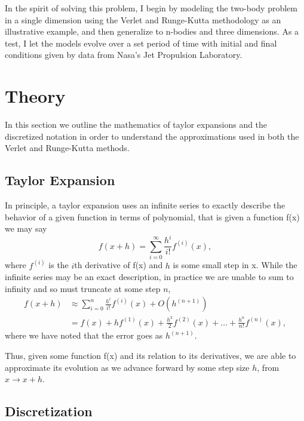 \documentclass[11pt,a4paper]{article}
\begin{document}
In the spirit of solving this problem, I begin by modeling the two-body problem in a single dimension using the Verlet and Runge-Kutta methodology as an illustrative example, and then generalize to n-bodies and three dimensions. As a test, I let the models evolve over a set period of time with initial and final conditions given by data from Nasa's Jet Propulsion Laboratory. 

\section{Theory}

In this section we outline the mathematics of taylor expansions and the discretized notation in order to understand the approximations used in both the Verlet and Runge-Kutta methods.

\subsection{Taylor Expansion}

In principle, a taylor expansion uses an infinite series to exactly describe the behavior of a given function in terms of polynomial, that is given a function f(x) we may say
\begin{equation}
f(x+h) = \sum\limits_{i=0}^{\infty} \frac{h^i}{i!}f^{(i)}(x),
\end{equation}
where $f^{(i)}$ is the $i$th derivative of f(x) and $h$ is some small step in x. While the infinite series may be an exact description, in practice we are unable to sum to infinity and so must truncate at some step $n$,
\begin{align}
f(x+h) 	&\approx \sum\limits_{i=0}^{n} \frac{h^i}{i!}f^{(i)}(x) + O(h^{(n+1)})\\
		&= f(x) + hf^{(1)}(x) + \frac{h^2}{2}f^{(2)}(x) + \dots + \frac{h^n}{n!}f^{(n)}(x),
\end{align}
where we have noted that the error goes as $h^{(n+1)}$. 

Thus, given some function f(x) and its relation to its derivatives, we are able to approximate its evolution as we advance forward by some step size $h$, from $x \rightarrow x+h$.

\subsection{Discretization}
\end{document}
